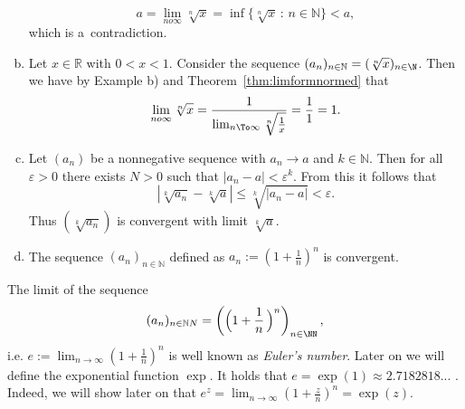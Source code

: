 \begin{example}{}
\begin{enumerate}[a)]
\[a=\lim_{n	o\infty}\sqrt[n]{x}=\inf\{\sqrt[n]{x}\,:\,n\in\mathbb{N}\}<a,\]
which is a~contradiction.
\item Let $x\in\mathbb{R}$ with $0< x<1$. Consider the sequence $(a_n)_{n\in\mathbb{N}}=(\sqrt[n]{x})_{n\in\N}$. Then we have by Example b) and Theorem~\ref{thm:limformnormed} that
\[\lim_{n	o\infty}\sqrt[n]{x}=\frac1{\lim_{n\To\infty}\sqrt[n]{\frac1x}}=\frac11=1.\]
\item Let $(a_{n})$ be a nonnegative sequence with $a_{n}\rightarrow a$ and $k\in\mathbb{N}$. Then for all $\varepsilon>0$ there exists $N>0$ such that $|a_{n}-a|<\varepsilon^{k}$. From this it follows that
$$
|\sqrt[k]{a_{n}}-\sqrt[k]{a}|\leq \sqrt[k]{|a_{n}-a|}<\varepsilon.
$$
Thus $(\sqrt[k]{a_{n}})$ is convergent with limit $\sqrt[k]{a}$.\\
\item The sequence $(a_{n})_{n\in\mathbb{N}}$ defined as $a_{n} := \left(1+\frac{1}{n}\right)^{n}$ is convergent.\\
\end{enumerate}
\end{example}

\begin{Remark}{}
The limit of the sequence \[(a_n)_{n \in \mathbb{N}N} = \left(  \Big(1+\frac{1}{n} \,\Big)^{n}\right)_{n \in \NN},\] 
i.e. $e:=\lim_{n\rightarrow\infty}\left(1+\frac{1}{n}\right)^{n}$ is well known as \textit{Euler's number}. Later on we will define the exponential function $\exp$. It holds that $e=\exp(1)\approx 2.7182818...$ . Indeed, we will show later on that $e^{z}=\lim_{n\rightarrow\infty}\left(1+\frac{z}{n}\right)^{n}=\exp(z)$.
\end{Remark}
